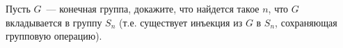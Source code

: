 Пусть $G$~--- конечная группа, докажите, что найдется такое $n$, что $G$ вкладывается в группу $S_n$
(т.е. существует инъекция из $G$ в $S_n$, сохраняющая групповую операцию).

